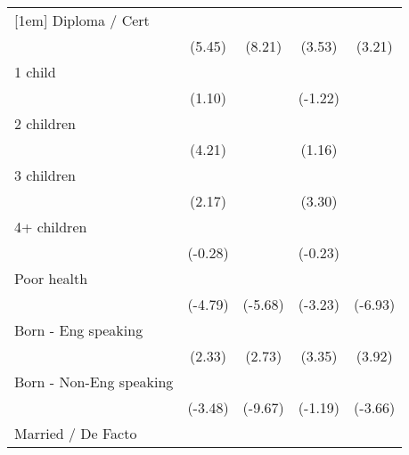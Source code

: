 {\begin{tabular}{l*{4}{c}}
[1em]
Diploma / Cert      &            \sym{***}&            \sym{***}&            \sym{***}&            \sym{**} \\
                    &      (5.45)         &      (8.21)         &      (3.53)         &      (3.21)         \\
[1em]
1 child             &                     &                     &                     &                     \\
                    &      (1.10)         &                     &     (-1.22)         &                     \\
[1em]
2 children          &            \sym{***}&                     &                     &                     \\
                    &      (4.21)         &                     &      (1.16)         &                     \\
[1em]
3 children          &            \sym{*}  &                     &            \sym{***}&                     \\
                    &      (2.17)         &                     &      (3.30)         &                     \\
[1em]
4+ children         &                     &                     &                     &                     \\
                    &     (-0.28)         &                     &     (-0.23)         &                     \\
[1em]
Poor health         &            \sym{***}&            \sym{***}&            \sym{**} &            \sym{***}\\
                    &     (-4.79)         &     (-5.68)         &     (-3.23)         &     (-6.93)         \\
[1em]
Born - Eng speaking &            \sym{*}  &            \sym{**} &            \sym{***}&            \sym{***}\\
                    &      (2.33)         &      (2.73)         &      (3.35)         &      (3.92)         \\
[1em]
Born - Non-Eng speaking&            \sym{***}&            \sym{***}&                     &            \sym{***}\\
                    &     (-3.48)         &     (-9.67)         &     (-1.19)         &     (-3.66)         \\
[1em]
Married / De Facto  &            \sym{***}&            \sym{***}&                     &            \sym{***}\\

\end{tabular}}
